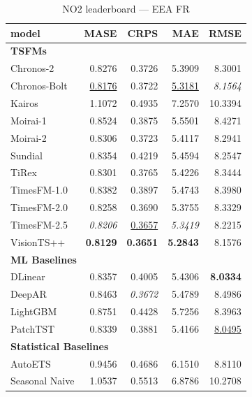 \begin{table}[H]
\caption{NO2 leaderboard --- EEA FR}
\centering
\begin{small}
\begin{tabular}{lrrrr}
\toprule
model & MASE & CRPS & MAE & RMSE \\
\midrule
\multicolumn{5}{l}{\textbf{TSFMs}} \\
Chronos-2 & 0.8276 & 0.3726 & 5.3909 & 8.3001 \\
Chronos-Bolt & \underline{0.8176} & 0.3722 & \underline{5.3181} & \textit{8.1564} \\
Kairos & 1.1072 & 0.4935 & 7.2570 & 10.3394 \\
Moirai-1 & 0.8524 & 0.3875 & 5.5501 & 8.4271 \\
Moirai-2 & 0.8306 & 0.3723 & 5.4117 & 8.2941 \\
Sundial & 0.8354 & 0.4219 & 5.4594 & 8.2547 \\
TiRex & 0.8301 & 0.3765 & 5.4226 & 8.3444 \\
TimesFM-1.0 & 0.8382 & 0.3897 & 5.4743 & 8.3980 \\
TimesFM-2.0 & 0.8258 & 0.3690 & 5.3755 & 8.3329 \\
TimesFM-2.5 & \textit{0.8206} & \underline{0.3657} & \textit{5.3419} & 8.2215 \\
VisionTS++ & \textbf{0.8129} & \textbf{0.3651} & \textbf{5.2843} & 8.1576 \\
\midrule
\multicolumn{5}{l}{\textbf{ML Baselines}} \\
DLinear & 0.8357 & 0.4005 & 5.4306 & \textbf{8.0334} \\
DeepAR & 0.8463 & \textit{0.3672} & 5.4789 & 8.4986 \\
LightGBM & 0.8751 & 0.4428 & 5.7256 & 8.3963 \\
PatchTST & 0.8339 & 0.3881 & 5.4166 & \underline{8.0495} \\
\midrule
\multicolumn{5}{l}{\textbf{Statistical Baselines}} \\
AutoETS & 0.9456 & 0.4686 & 6.1510 & 8.8110 \\
Seasonal Naive & 1.0537 & 0.5513 & 6.8786 & 10.2708 \\
\bottomrule
\end{tabular}
\end{small}
\end{table}